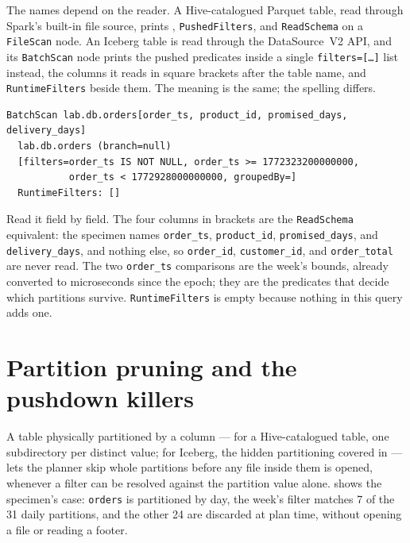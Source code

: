 The names depend on the reader. A Hive-catalogued Parquet table, read through
Spark's built-in file source, prints ,
\texttt{PushedFilters}, and \texttt{ReadSchema} on a \texttt{FileScan} node. An
Iceberg table is read through the DataSource~V2 API, and its \texttt{BatchScan}
node prints the pushed predicates inside a single \texttt{filters=[\ldots]} list
instead, the columns it reads in square brackets after the table name, and
\texttt{RuntimeFilters} beside them. The meaning is the same; the spelling
differs.

\begin{lstlisting}[language=text,numbers=none,style=plan,caption={The specimen's Iceberg scan node (\texttt{EXPLAIN}, one line wrapped)},captionpos=b,label=lst:pruning-scan-node]
BatchScan lab.db.orders[order_ts, product_id, promised_days, delivery_days]
  lab.db.orders (branch=null)
  [filters=order_ts IS NOT NULL, order_ts >= 1772323200000000,
           order_ts < 1772928000000000, groupedBy=]
  RuntimeFilters: []
\end{lstlisting}

Read it field by field. The four columns in brackets are the \texttt{ReadSchema}
equivalent: the specimen names \texttt{order\_ts}, \texttt{product\_id},
\texttt{promised\_days}, and \texttt{delivery\_days}, and nothing else, so
\texttt{order\_id}, \texttt{customer\_id}, and \texttt{order\_total} are never
read. The two \texttt{order\_ts} comparisons are the week's bounds, already
converted to microseconds since the epoch; they are the predicates that decide
which partitions survive. \texttt{RuntimeFilters} is empty because nothing in
this query adds one.

\section{Partition pruning and the pushdown killers}
\label{sec:pruning-static}

A table physically partitioned by a column --- for a Hive-catalogued table, one
subdirectory per distinct value; for Iceberg, the hidden partitioning covered in
 --- lets the planner skip whole partitions before any
file inside them is opened, whenever a filter can be resolved against the
partition value alone.  shows the specimen's case:
\texttt{orders} is partitioned by day, the week's filter matches 7 of the 31
daily partitions, and the other 24 are discarded at plan time, without opening
a file or reading a footer.

